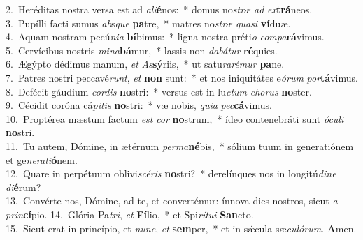 {2.~}Heréditas nostra versa est ad \textit{a}\textit{li}\textbf{é}nos:~* domus no\textit{stræ} \textit{ad} \textit{ex}\textbf{trá}neos.\\
{3.~}Pupílli facti sumus \textit{ab}s\textit{que} \textbf{pa}tre,~* matres no\textit{stræ} \textit{qua}\textit{si} \textbf{ví}duæ.\\
{4.~}Aquam nostram pecú\textit{ni}\textit{a} \textbf{bí}bimus:~* ligna nostra préti\textit{o} \textit{com}\textit{pa}\textbf{rá}vimus.\\
{5.~}Cervícibus nostris \textit{mi}\textit{na}\textbf{bá}mur,~* lassis non \textit{da}\textit{bá}\textit{tur} \textbf{ré}quies.\\
{6.~}Ægýpto dédimus manum, \textit{et} \textit{As}\textbf{sý}riis,~* ut satu\textit{ra}\textit{ré}\textit{mur} \textbf{pa}ne.\\
{7.~}Patres nostri peccavé\textit{runt}, \textit{et} \textbf{non} sunt:~* et nos iniquitátes e\textit{ó}\textit{rum} \textit{por}\textbf{tá}vimus.\\
{8.~}Defécit gáudium \textit{cor}\textit{dis} \textbf{no}stri:~* versus est in lu\textit{ctum} \textit{cho}\textit{rus} \textbf{no}ster.\\
{9.~}Cécidit coróna cá\textit{pi}\textit{tis} \textbf{no}stri:~* væ nobis, \textit{qui}\textit{a} \textit{pec}\textbf{cá}vimus.\\
{10.~}Proptérea mæstum factum \textit{est} \textit{cor} \textbf{no}strum,~* ídeo contenebráti sunt \textit{ó}\textit{cu}\textit{li} \textbf{no}stri.\\
{11.~}Tu autem, Dómine, in ætérnum \textit{per}\textit{ma}\textbf{né}bis,~* sólium tuum in generatiónem et ge\textit{ne}\textit{ra}\textit{ti}\textbf{ó}nem.\\
{12.~}Quare in perpétuum oblivi\textit{scé}\textit{ris} \textbf{no}stri?~* derelínques nos in longitú\textit{di}\textit{ne} \textit{di}\textbf{é}rum?\\
{13.~}Convérte nos, Dómine, ad te, et convertémur: ínnova dies nostros, sicut \textit{a} \textit{prin}\textbf{cí}pio.
{14.~}Glória Pa\textit{tri}, \textit{et} \textbf{Fí}lio,~* et Spi\textit{rí}\textit{tu}\textit{i} \textbf{San}cto.\\
{15.~}Sicut erat in princípio, et \textit{nunc}, \textit{et} \textbf{sem}per,~* et in sǽcula sæ\textit{cu}\textit{ló}\textit{rum}. \textbf{A}men.\\
